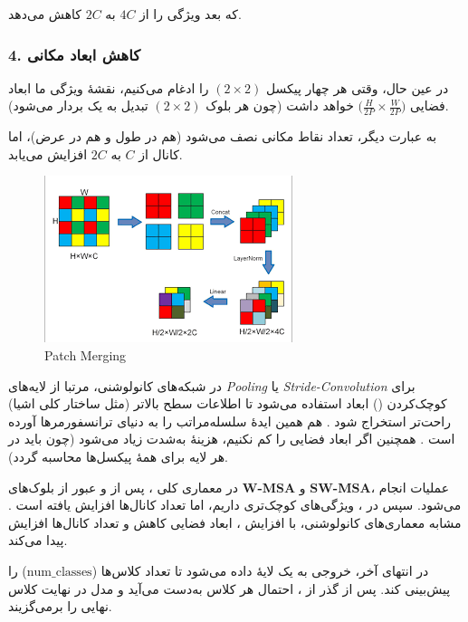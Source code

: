 که بعد ویژگی را از \(\displaystyle 4C\) به \(\displaystyle 2C\) کاهش می‌دهد.

\subsubsection{4. کاهش ابعاد مکانی}
در عین حال، وقتی هر چهار پیکسل \((2 \times 2)\) را ادغام می‌کنیم، 
نقشهٔ ویژگی ما ابعاد فضایی \(\bigl(\tfrac{H}{2P} \times \tfrac{W}{2P}\bigr)\) خواهد داشت 
(چون هر بلوک \((2 \times 2)\) تبدیل به یک بردار می‌شود).

به عبارت دیگر، تعداد نقاط مکانی نصف می‌شود (هم در طول و هم در عرض)، 
اما کانال از \(\displaystyle C\) به \(\displaystyle 2C\) افزایش می‌یابد.

\begin{figure}[h]
	\centering
	\begin{minipage}[b]{1\textwidth}
		\centering
		\includegraphics[width=\textwidth]{transformer_images/patch_merging.png}
		\caption{Patch Merging}
		\label{fig:patch merging in Swin Transformer}
	\end{minipage}
	\hfill
\end{figure}

در شبکه‌های کانولوشنی، مرتبا از لایه‌های \textit{Pooling} یا \textit{Stride-Convolution} 
برای کوچک‌کردن () ابعاد استفاده می‌شود تا اطلاعات سطح بالاتر (مثل ساختار کلی اشیا) راحت‌تر استخراج شود \cite{he2016deep}.  
 هم همین ایدهٔ سلسله‌مراتب را به دنیای ترانسفورمرها آورده است \cite{liu2021swintransformer}.  
همچنین اگر ابعاد فضایی را کم نکنیم، هزینهٔ  به‌شدت زیاد می‌شود 
(چون باید در هر لایه برای همهٔ پیکسل‌ها  محاسبه گردد).

در معماری کلی ، پس از  و عبور از بلوک‌های \textbf{W-MSA} و \textbf{SW-MSA}، عملیات  انجام می‌شود. سپس در ، ویژگی‌های کوچک‌تری داریم، اما تعداد کانال‌ها افزایش یافته است \cite{liu2021swintransformer}.  
مشابه معماری‌های کانولوشنی، با افزایش ، ابعاد فضایی کاهش و تعداد کانال‌ها افزایش پیدا می‌کند.

در انتهای  آخر، خروجی به یک لایهٔ  داده می‌شود تا تعداد کلاس‌ها (\( \mathrm{num\_classes} \)) را پیش‌بینی کند.  
پس از گذر از ، احتمال هر کلاس به‌دست می‌آید و مدل در نهایت کلاس نهایی را برمی‌گزیند.






